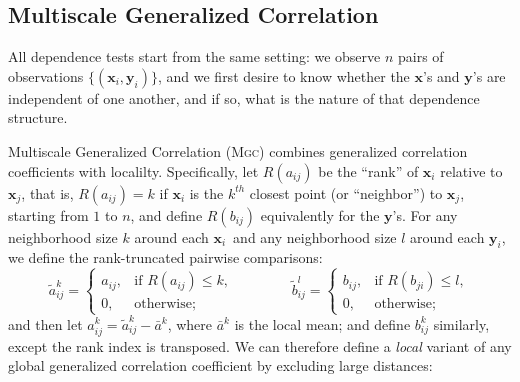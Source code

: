 \documentclass[11pt]{article}
\providecommand{\sct}[1]{{\normalfont\textsc{#1}}}
\providecommand{\mt}[1]{\widetilde{#1}}
\providecommand{\mb}[1]{\boldsymbol{#1}}
\newcommand{\Mgc}{\sct{Mgc}}
\newcommand{\mbx}{\ensuremath{\mb{x}}}
\newcommand{\mby}{\ensuremath{\mb{y}}}
\begin{document}


\subsection*{Multiscale Generalized Correlation}
\label{s:mgc}

All dependence tests start from the same setting: we observe $n$ pairs of observations $\{(\mb{x}_i,\mb{y}_i)\}$, and we first desire to know whether the \mbx's and \mby's are independent of one another, and if so, what is the nature of that dependence structure.


Multiscale Generalized Correlation (\Mgc) combines generalized correlation coefficients with localilty.
Specifically, let $R(a_{ij})$  be the ``rank'' of $\mb{x}_i$ relative to $\mb{x}_j$, that is, $R(a_{ij})=k$ if $\mb{x}_i$ is the $k^{th}$ closest point (or ``neighbor'') to $\mb{x}_j$, starting from $1$ to $n$, and define $R(b_{ij})$ equivalently for the \mby's. For any neighborhood size $k$ around each $\mb{x}_i$~and any neighborhood size $l$ around each $\mb{y}_i$, we define the rank-truncated pairwise comparisons:
\begin{equation}
\label{localCoef2}
    \mt{a}_{ij}^k=
    \begin{cases}
      a_{ij}, & \text{if } R(a_{ij}) \leq k, \\
      0, & \text{otherwise};
    \end{cases} \qquad \qquad
    \mt{b}_{ij}^l=
    \begin{cases}
      b_{ij}, & \text{if } R(b_{ji}) \leq l, \\
      0, & \text{otherwise};
    \end{cases}
\end{equation}
and then let $a^k_{ij}=\mt{a}^k_{ij} - \bar{a}^k$, 
where $\bar{a}^k$ is the local mean;
and define $b^k_{ij}$ similarly, except the rank index is transposed. 
We can therefore define a \emph{local} variant of any global generalized correlation coefficient by  excluding large distances: %
\end{document}
